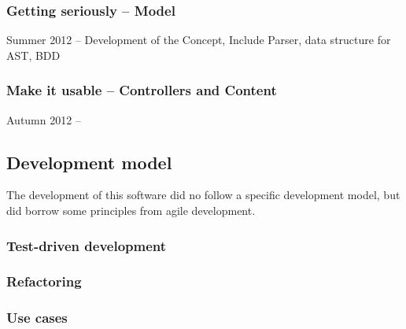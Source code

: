 \subsubsection{Getting seriously – Model}

Summer 2012 – Development of the Concept, Include Parser, data structure for AST, BDD

\subsubsection{Make it usable – Controllers and Content}

Autumn 2012 – 

\subsection{Development model}

The development of this software did no follow a specific development model, 
but did borrow some principles from agile development.

\subsubsection{Test-driven development}



\subsubsection{Refactoring}

\subsubsection{Use cases}


